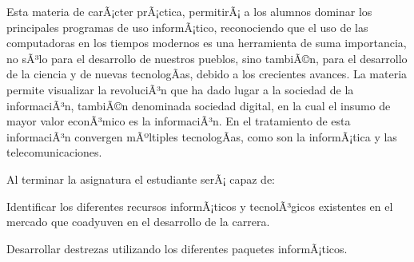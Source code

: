 \begin{syllabus}


\begin{justification}
Esta materia de carÃ¡cter prÃ¡ctica, permitirÃ¡ a los alumnos dominar los principales programas de uso informÃ¡tico, reconociendo que el uso de las computadoras en los tiempos modernos es una herramienta de suma importancia, no sÃ³lo para el desarrollo de nuestros pueblos, sino tambiÃ©n, para el desarrollo de la ciencia y de nuevas tecnologÃ­as, debido a los crecientes avances. La materia permite visualizar la revoluciÃ³n que ha dado lugar a la sociedad de la informaciÃ³n, tambiÃ©n denominada sociedad digital, en la cual el insumo de mayor valor econÃ³mico es la informaciÃ³n. En el tratamiento de esta informaciÃ³n convergen mÃºltiples tecnologÃ­as, como son la informÃ¡tica y las telecomunicaciones. 
\end{justification}

\begin{goals}
Al terminar la asignatura el estudiante serÃ¡ capaz de:

\item Identificar los diferentes recursos informÃ¡ticos y tecnolÃ³gicos existentes en el mercado que coadyuven en el desarrollo de la carrera.
\item Desarrollar destrezas utilizando los diferentes paquetes informÃ¡ticos.
\end{goals}

\begin{outcomes}
\end{outcomes}


\end{syllabus}
